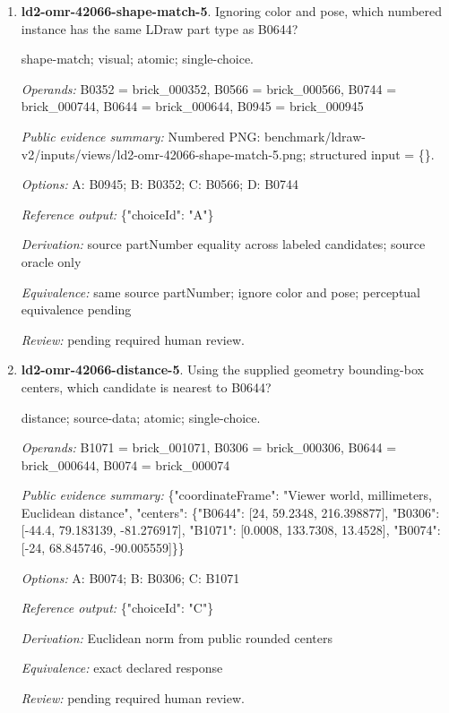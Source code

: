 \begin{enumerate}
\par{\small color; visual; atomic; single-choice.\par\textit{Operands:} B0644 = brick\_000644\par\textit{Public evidence summary:} Numbered PNG: benchmark/ldraw-v2/inputs/views/ld2-omr-42066-color-5.png; structured input = \{\}.\par\textit{Options:} A: Medium Blue; B: Dark Brown; C: Light Bluish Grey; D: Yellow\par\textit{Reference output:} \{"choiceId": "C"\}\par\textit{Derivation:} source colorName by rendered B-label; source oracle only\par\textit{Equivalence:} exact declared response\par\textit{Review:} pending required human review.}
\item \textbf{ld2-omr-42066-shape-match-5}. Ignoring color and pose, which numbered instance has the same LDraw part type as B0644?
\par{\small shape-match; visual; atomic; single-choice.\par\textit{Operands:} B0352 = brick\_000352, B0566 = brick\_000566, B0744 = brick\_000744, B0644 = brick\_000644, B0945 = brick\_000945\par\textit{Public evidence summary:} Numbered PNG: benchmark/ldraw-v2/inputs/views/ld2-omr-42066-shape-match-5.png; structured input = \{\}.\par\textit{Options:} A: B0945; B: B0352; C: B0566; D: B0744\par\textit{Reference output:} \{"choiceId": "A"\}\par\textit{Derivation:} source partNumber equality across labeled candidates; source oracle only\par\textit{Equivalence:} same source partNumber; ignore color and pose; perceptual equivalence pending\par\textit{Review:} pending required human review.}
\item \textbf{ld2-omr-42066-distance-5}. Using the supplied geometry bounding-box centers, which candidate is nearest to B0644?
\par{\small distance; source-data; atomic; single-choice.\par\textit{Operands:} B1071 = brick\_001071, B0306 = brick\_000306, B0644 = brick\_000644, B0074 = brick\_000074\par\textit{Public evidence summary:} \{"coordinateFrame": "Viewer world, millimeters, Euclidean distance", "centers": \{"B0644": [24, 59.2348, 216.398877], "B0306": [-44.4, 79.183139, -81.276917], "B1071": [0.0008, 133.7308, 13.4528], "B0074": [-24, 68.845746, -90.005559]\}\}\par\textit{Options:} A: B0074; B: B0306; C: B1071\par\textit{Reference output:} \{"choiceId": "C"\}\par\textit{Derivation:} Euclidean norm from public rounded centers\par\textit{Equivalence:} exact declared response\par\textit{Review:} pending required human review.}

\end{enumerate}

